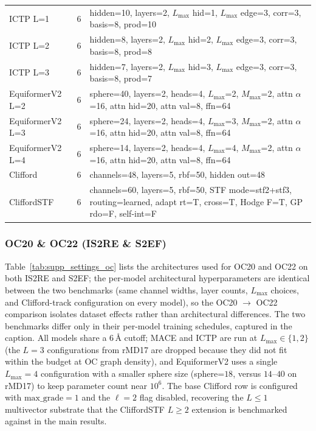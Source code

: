 \begin{table}[h]
{\begin{tabular}{l c l}
ICTP L=1 & 6 & hidden=10, layers=2, $L_{\max}$ hid=1, $L_{\max}$ edge=3, corr=3, basis=8, prod=10 \\
ICTP L=2 & 6 & hidden=8, layers=2, $L_{\max}$ hid=2, $L_{\max}$ edge=3, corr=3, basis=8, prod=8 \\
ICTP L=3 & 6 & hidden=7, layers=2, $L_{\max}$ hid=3, $L_{\max}$ edge=3, corr=3, basis=8, prod=7 \\
EquiformerV2 L=2 & 6 & sphere=40, layers=2, heads=4, $L_{\max}$=2, $M_{\max}$=2, attn $\alpha$=16, attn hid=20, attn val=8, ffn=64 \\
EquiformerV2 L=3 & 6 & sphere=24, layers=2, heads=4, $L_{\max}$=3, $M_{\max}$=2, attn $\alpha$=16, attn hid=20, attn val=8, ffn=64 \\
EquiformerV2 L=4 & 6 & sphere=14, layers=2, heads=4, $L_{\max}$=4, $M_{\max}$=2, attn $\alpha$=16, attn hid=20, attn val=8, ffn=64 \\
Clifford & 6 & channels=48, layers=5, rbf=50, hidden out=48 \\
CliffordSTF & 6 & channels=60, layers=5, rbf=50, STF mode=stf2+stf3, routing=learned, adapt rt=T, cross=T, Hodge F=T, GP rdo=F, self-int=F \\
\bottomrule
\end{tabular}%
}
\end{table}

\subsubsection{OC20 \& OC22 (IS2RE \& S2EF)}

Table~\ref{tab:supp_settings_oc} lists the architectures used for OC20 and OC22 on both IS2RE and S2EF; the per-model architectural hyperparameters are identical between the two benchmarks (same channel widths, layer counts, $L_{\max}$ choices, and Clifford-track configuration on every model), so the OC20 $\to$ OC22 comparison isolates dataset effects rather than architectural differences. The two benchmarks differ only in their per-model training schedules, captured in the caption. All models share a $6$\,\AA{} cutoff; MACE and ICTP are run at $L_{\max}\!\in\!\{1, 2\}$ (the $L\!=\!3$ configurations from rMD17 are dropped because they did not fit within the budget at OC graph density), and EquiformerV2 uses a single $L_{\max}\!=\!4$ configuration with a smaller sphere size (sphere=$18$, versus $14$--$40$ on rMD17) to keep parameter count near $10^6$. The base Clifford row is configured with $\mathrm{max\_grade}\!=\!1$ and the $\ell\!=\!2$ flag disabled, recovering the $L\!\leq\!1$ multivector substrate that the CliffordSTF $L\!\geq\!2$ extension is benchmarked against in the main results.

